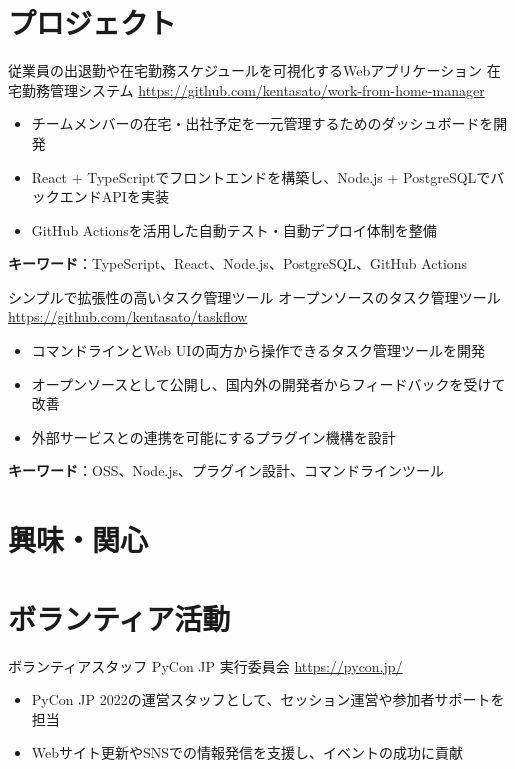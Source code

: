 \documentclass[a4paper, serif, 10pt]{moderncv}
\begin{document}
\section{プロジェクト}

        {従業員の出退勤や在宅勤務スケジュールを可視化するWebアプリケーション}
        {在宅勤務管理システム}
        {\url{https://github.com/kentasato/work-from-home-manager}}
        {}
        {\begin{itemize}
\item チームメンバーの在宅・出社予定を一元管理するためのダッシュボードを開発
\item React + TypeScriptでフロントエンドを構築し、Node.js + PostgreSQLでバックエンドAPIを実装
\item GitHub Actionsを活用した自動テスト・自動デプロイ体制を整備
\end{itemize}
\textbf{キーワード}：TypeScript、React、Node.js、PostgreSQL、GitHub Actions}

        {シンプルで拡張性の高いタスク管理ツール}
        {オープンソースのタスク管理ツール}
        {\url{https://github.com/kentasato/taskflow}}
        {}
        {\begin{itemize}
\item コマンドラインとWeb UIの両方から操作できるタスク管理ツールを開発
\item オープンソースとして公開し、国内外の開発者からフィードバックを受けて改善
\item 外部サービスとの連携を可能にするプラグイン機構を設計
\end{itemize}
\textbf{キーワード}：OSS、Node.js、プラグイン設計、コマンドラインツール}
\section{興味・関心}

\section{ボランティア活動}

        {ボランティアスタッフ}
        {PyCon JP 実行委員会}
        {\url{https://pycon.jp/}}
        {}
        {\begin{itemize}
\item PyCon JP 2022の運営スタッフとして、セッション運営や参加者サポートを担当
\item Webサイト更新やSNSでの情報発信を支援し、イベントの成功に貢献
\end{itemize}}
\end{document}
